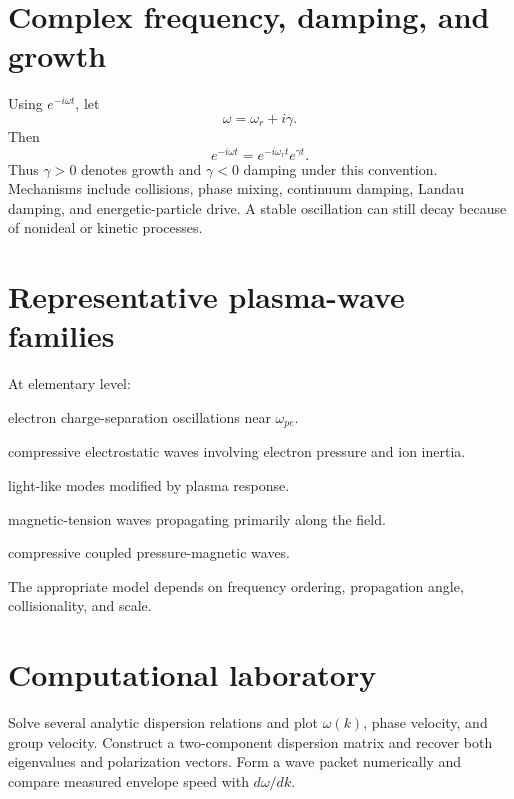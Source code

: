 \documentclass[11pt]{article}
\begin{document}
\section{Complex frequency, damping, and growth}

Using $e^{-i\omega t}$, let
\begin{equation}
\omega=\omega_r+i\gamma.
\end{equation}
Then
\begin{equation}
e^{-i\omega t}=e^{-i\omega_rt}e^{\gamma t}.
\end{equation}
Thus $\gamma>0$ denotes growth and $\gamma<0$ damping under this convention. Mechanisms include collisions, phase mixing, continuum damping, Landau damping, and energetic-particle drive. A stable oscillation can still decay because of nonideal or kinetic processes.


\section{Representative plasma-wave families}

At elementary level:
\begin{description}[leftmargin=2.5em]
\item[Langmuir waves:] electron charge-separation oscillations near $\omega_{pe}$.
\item[Ion-acoustic waves:] compressive electrostatic waves involving electron pressure and ion inertia.
\item[Electromagnetic waves:] light-like modes modified by plasma response.
\item[Alfvén waves:] magnetic-tension waves propagating primarily along the field.
\item[Magnetosonic waves:] compressive coupled pressure-magnetic waves.
\end{description}
The appropriate model depends on frequency ordering, propagation angle, collisionality, and scale.


\section{Computational laboratory}
Solve several analytic dispersion relations and plot $\omega(k)$, phase velocity, and group velocity. Construct a two-component dispersion matrix and recover both eigenvalues and polarization vectors. Form a wave packet numerically and compare measured envelope speed with $d\omega/dk$.
\end{document}
